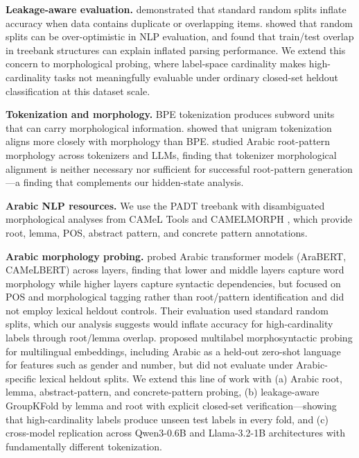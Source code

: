\documentclass[11pt,a4paper]{article}
\begin{document}
\textbf{Leakage-aware evaluation.} \citet{gorman-bedrick-2019} demonstrated that standard random splits inflate accuracy when data contains duplicate or overlapping items. \citet{sogaard-etal-2021} showed that random splits can be over-optimistic in NLP evaluation, and \citet{sogaard-2020-leak} found that train/test overlap in treebank structures can explain inflated parsing performance. We extend this concern to morphological probing, where label-space cardinality makes high-cardinality tasks not meaningfully evaluable under ordinary closed-set heldout classification at this dataset scale.

\textbf{Tokenization and morphology.} BPE tokenization \citep{sennrich-etal-2016} produces subword units that can carry morphological information. \citet{bostrom-durrett-2020} showed that unigram tokenization aligns more closely with morphology than BPE. \citet{alakeel-etal-2026} studied Arabic root-pattern morphology across tokenizers and LLMs, finding that tokenizer morphological alignment is neither necessary nor sufficient for successful root-pattern generation---a finding that complements our hidden-state analysis.

\textbf{Arabic NLP resources.} We use the PADT treebank \citep{taji-etal-2017} with disambiguated morphological analyses from CAMeL Tools \citep{obeid-etal-2020} and CAMELMORPH \citep{khairallah-etal-2024}, which provide root, lemma, POS, abstract pattern, and concrete pattern annotations.

\textbf{Arabic morphology probing.} \citet{abdelali-etal-2022} probed Arabic transformer models (AraBERT, CAMeLBERT) across layers, finding that lower and middle layers capture word morphology while higher layers capture syntactic dependencies, but focused on POS and morphological tagging rather than root/pattern identification and did not employ lexical heldout controls. Their evaluation used standard random splits, which our analysis suggests would inflate accuracy for high-cardinality labels through root/lemma overlap. \citet{shapiro-etal-2021} proposed multilabel morphosyntactic probing for multilingual embeddings, including Arabic as a held-out zero-shot language for features such as gender and number, but did not evaluate under Arabic-specific lexical heldout splits. We extend this line of work with (a) Arabic root, lemma, abstract-pattern, and concrete-pattern probing, (b) leakage-aware GroupKFold by lemma and root with explicit closed-set verification---showing that high-cardinality labels produce unseen test labels in every fold, and (c) cross-model replication across Qwen3-0.6B and Llama-3.2-1B architectures with fundamentally different tokenization.
\end{document}
